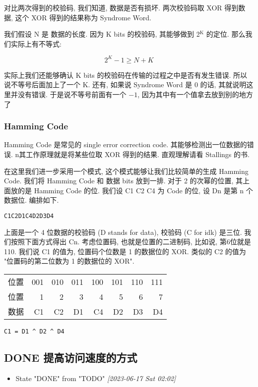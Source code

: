 \documentclass[11pt]{article}
\begin{document}
对比两次得到的校验码, 我们知道, 数据是否有损坏. 两次校验码取 XOR 得到数据, 这个 XOR 得到的结果称为 Syndrome Word.

我们假设 N 是 数据的长度. 因为 K bits 的校验码, 其能够做到 2\(^{\text{K}}\) 的定位.
那么我们实际上有不等式:

\[
2 ^ K  - 1 \ge  N  + K 
\]

实际上我们还能够确认 K bits 的校验码在传输的过程之中是否有发生错误.  所以说不等号后面加上了一个 K. 还有, 如果说 Syndrome Word 是 0 的话, 其就说明这里并没有错误. 于是说不等号前面有一个  \(-1\), 因为其中有一个值拿去放到别的地方了

\subsubsection{Hamming Code}
\label{sec:org5ff0e3a}

Hamming Code 是常见的 single error correction code. 其能够检测出一位数据的错误. n其工作原理就是将某些位取 XOR 得到的结果. 直观理解请看 Stallings 的书.

在这里我们进一步采用一个模式, 这个模式能够让我们比较简单的生成 Hamming
Code. 我们将 Hamming Code 和 数据 bits 放到一排.  对于 2 的次幂的位置,
其上面放的是 Hamming Code 的位. 我们设 C1 C2 C4 为 Code 的位, 设 Dn 
是第 n 个数据位. 编排如下.

\begin{verbatim}
C1C2D1C4D2D3D4
\end{verbatim}

上面是一个 4 位数据的校验码 (D stands for data), 校验码 (C for idk) 是三位. 
我们按照下面方式得出 Cn. 考虑位置码, 也就是位置的二进制码, 比如说, 
第6位就是 110. 我们说 C1 的值为, 位置码个位数是 1 的数据位的 XOR. 类似的 
C2 的值为 "位置码的第二位数为 1 的数据位的 XOR".

\begin{center}
\begin{tabular}{lrrrrrrr}
位置 & 001 & 010 & 011 & 100 & 101 & 110 & 111\\
位置 & 1 & 2 & 3 & 4 & 5 & 6 & 7\\
数据 & C1 & C2 & D1 & C4 & D2 & D3 & D4\\
\end{tabular}
\end{center}

\begin{verbatim}
C1 = D1 ^ D2 ^ D4
\end{verbatim}

\subsection{{\bfseries\sffamily DONE} 提高访问速度的方式}
\label{sec:org6b57e37}
\begin{itemize}
\item State "DONE"       from "TODO"       \textit{[2023-06-17 Sat 02:02]}
\end{itemize}
\end{document}
